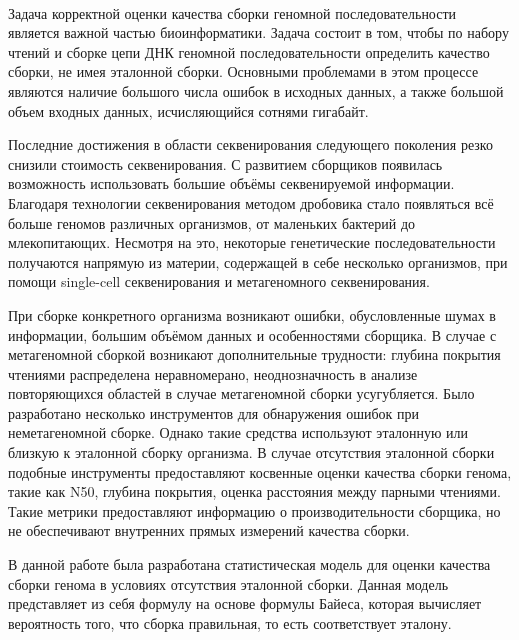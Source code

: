 \startprefacepage \\
Задача корректной оценки качества сборки геномной последовательности является важной частью биоинформатики. Задача состоит в том, чтобы по набору чтений и сборке цепи ДНК геномной последовательности определить качество сборки, не имея эталонной сборки. Основными проблемами в этом процессе являются наличие большого числа ошибок в исходных данных, а также большой объем входных данных, исчисляющийся сотнями гигабайт. 

Последние достижения в области  секвенирования следующего поколения резко снизили стоимость секвенирования. С развитием сборщиков появилась возможность использовать большие объёмы секвенируемой информации. Благодаря технологии секвенирования методом дробовика стало появляться всё больше геномов различных организмов, от маленьких бактерий до млекопитающих. Несмотря на это, некоторые генетические последовательности получаются напрямую из материи, содержащей в себе несколько организмов, при помощи single-cell секвенирования и метагеномного секвенирования. 

При сборке конкретного организма возникают ошибки, обусловленные шумах в информации, большим объёмом данных и особенностями сборщика. В случае с метагеномной сборкой возникают дополнительные трудности: глубина покрытия чтениями распределена неравномерано, неоднозначность в анализе повторяющихся областей в случае метагеномной сборки усугубляется. Было разработано несколько инструментов для обнаружения ошибок при неметагеномной сборке. Однако такие средства используют эталонную или близкую к эталонной сборку организма. В случае отсутствия эталонной сборки подобные инструменты предоставляют косвенные оценки качества сборки генома, такие как N50, глубина покрытия, оценка расстояния между парными чтениями. Такие метрики предоставляют информацию о производительности сборщика, но не обеспечивают внутренних прямых измерений качества сборки.

В данной работе была разработана статистическая модель для оценки качества сборки генома в условиях отсутствия эталонной сборки. Данная модель представляет из себя формулу на основе формулы Байеса, которая вычисляет вероятность того, что сборка правильная, то есть соответствует эталону.